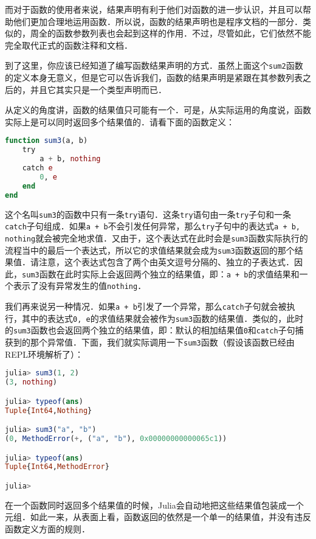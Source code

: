 而对于函数的使用者来说，结果声明有利于他们对函数的进一步认识，并且可以帮助他们更加合理地运用函数．所以说，函数的结果声明也是程序文档的一部分．类似的，周全的函数参数列表也会起到这样的作用．不过，尽管如此，它们依然不能完全取代正式的函数注释和文档．

到了这里，你应该已经知道了编写函数结果声明的方式．虽然上面这个\verb|sum2|函数的定义本身无意义，但是它可以告诉我们，函数的结果声明是紧跟在其参数列表之后的，并且它其实只是一个类型声明而已．

从定义的角度讲，函数的结果值只可能有一个．可是，从实际运用的角度说，函数实际上是可以同时返回多个结果值的．请看下面的函数定义：

\begin{lstlisting}[language=julia]
function sum3(a, b)
    try
        a + b, nothing
    catch e
        0, e
    end
end
\end{lstlisting}

这个名叫\verb|sum3|的函数中只有一条\verb|try|语句．这条\verb|try|语句由一条\verb|try|子句和一条\verb|catch|子句组成．如果\verb|a + b|不会引发任何异常，那么\verb|try|子句中的表达式\verb|a + b, nothing|就会被完全地求值．又由于，这个表达式在此时会是\verb|sum3|函数实际执行的流程当中的最后一个表达式，所以它的求值结果就会成为\verb|sum3|函数返回的那个结果值．请注意，这个表达式包含了两个由英文逗号分隔的、独立的子表达式．因此，\verb|sum3|函数在此时实际上会返回两个独立的结果值，即：\verb|a + b|的求值结果和一个表示了没有异常发生的值\verb|nothing|．

我们再来说另一种情况．如果\verb|a + b|引发了一个异常，那么\verb|catch|子句就会被执行，其中的表达式\verb|0, e|的求值结果就会被作为\verb|sum3|函数的结果值．类似的，此时的\verb|sum3|函数也会返回两个独立的结果值，即：默认的相加结果值\verb|0|和\verb|catch|子句捕获到的那个异常值．下面，我们就实际调用一下\verb|sum3|函数（假设该函数已经由REPL环境解析了）：

\begin{lstlisting}[language=julia]
julia> sum3(1, 2)
(3, nothing)

julia> typeof(ans)
Tuple{Int64,Nothing}

julia> sum3("a", "b")
(0, MethodError(+, ("a", "b"), 0x00000000000065c1))

julia> typeof(ans)
Tuple{Int64,MethodError}

julia> 
\end{lstlisting}

在一个函数同时返回多个结果值的时候，Julia会自动地把这些结果值包装成一个元组．如此一来，从表面上看，函数返回的依然是一个单一的结果值，并没有违反函数定义方面的规则．

